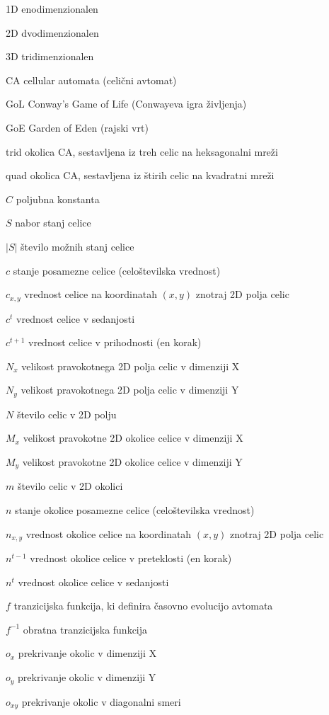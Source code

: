 \documentclass[12pt,a4paper,openany,twoside]{book}
\newcommand{\abbrlabel}[1]{\makebox[3cm][l]{\textbf{#1}\ \dotfill}}
\newenvironment{abbreviations}{\begin{list}{}{\renewcommand{\makelabel}{\abbrlabel}}}{\end{list}}
\begin{document}
\begin{abbreviations}
\item[1D] enodimenzionalen
\item[2D] dvodimenzionalen
\item[3D] tridimenzionalen
\item[CA] cellular automata (celični avtomat)
\item[GoL] Conway's Game of Life (Conwayeva igra življenja)
\item[GoE] Garden of Eden (rajski vrt)
\item[trid] okolica CA, sestavljena iz treh celic na heksagonalni mreži
\item[quad] okolica CA, sestavljena iz štirih celic na kvadratni mreži

\item[\(C\)] poljubna konstanta
\item[\(S\)] nabor stanj celice
\item[\(|S|\)] število možnih stanj celice
\item[\(c\)] stanje posamezne celice (celoštevilska vrednost)
\item[\(c_{x,y}\)] vrednost celice na koordinatah \((x,y)\) znotraj 2D polja celic
\item[\(c^t\)] vrednost celice v sedanjosti
\item[\(c^{t+1}\)] vrednost celice v prihodnosti (en korak)
\item[\(N_x\)] velikost pravokotnega 2D polja celic v dimenziji X
\item[\(N_y\)] velikost pravokotnega 2D polja celic v dimenziji Y
\item[\(N\)] število celic v 2D polju
\item[\(M_x\)] velikost pravokotne 2D okolice celice v dimenziji X
\item[\(M_y\)] velikost pravokotne 2D okolice celice v dimenziji Y
\item[\(m\)] število celic v 2D okolici
\item[\(n\)] stanje okolice posamezne celice (celoštevilska vrednost)
\item[\(n_{x,y}\)] vrednost okolice celice na koordinatah \((x,y)\) znotraj 2D polja celic
\item[\(n^{t-1}\)] vrednost okolice celice v preteklosti (en korak)
\item[\(n^t\)] vrednost okolice celice v sedanjosti
\item[\(f\)] tranzicijska funkcija, ki definira časovno evolucijo avtomata
\item[\(f^{-1}\)] obratna tranzicijska funkcija
\item[\(o_x\)] prekrivanje okolic v dimenziji X
\item[\(o_y\)] prekrivanje okolic v dimenziji Y
\item[\(o_{xy}\)] prekrivanje okolic v diagonalni smeri
\end{abbreviations}
\end{document}
